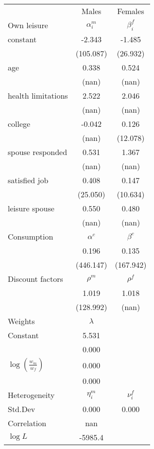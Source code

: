 \begin{tabular}{lcc} 
\hline\hline 
 & Males & Females \\ 
Own leisure & $\alpha_{i}^{m}$ & $\beta_{i}^{f}$ \\ 
constant & -2.343 & -1.485 \\ 
 & (105.087) & (26.932) \\ 
age & 0.338 & 0.524 \\ 
 & (nan) & (nan) \\ 
health limitations & 2.522 & 2.046 \\ 
 & (nan) & (nan) \\ 
college & -0.042 & 0.126 \\ 
 & (nan) & (12.078) \\ 
spouse responded & 0.531 & 1.367 \\ 
 & (nan) & (nan) \\ 
satisfied job & 0.408 & 0.147 \\ 
 & (25.050) & (10.634) \\ 
leisure spouse & 0.550 & 0.480 \\ 
 & (nan) & (nan) \\ 
Consumption & $\alpha^{c}$ & $\beta^{c}$ \\ 
 & 0.196 & 0.135 \\ 
 & (446.147) & (167.942) \\ 
Discount factors & $\rho^m$ & $\rho^f$ \\ 
 & 1.019 & 1.018 \\ 
 & (128.992) & (nan) \\ 
Weights & $\lambda$ &  \\ 
Constant & 5.531 &  \\ 
 & 0.000 &  \\ 
$\log(\frac{w_m}{w_f})$ & 0.000 &  \\ 
 & 0.000 &  \\ 
Heterogeneity & $\eta_i^m$ & $\nu_i^f$ \\ 
Std.Dev & 0.000 & 0.000 \\ 
Correlation & nan &  \\ 
\hline 
$\log L$ & -5985.4 & \\ 
\hline \hline 
\end{tabular} 
